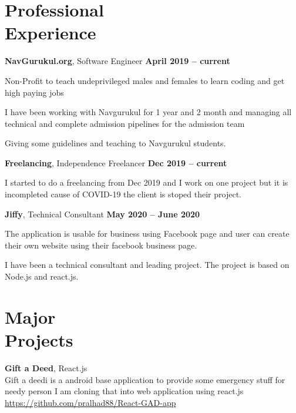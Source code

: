 \documentclass[margin,line]{resume}
\begin{document}
\begin{resume}
    \section{\mysidestyle Professional\\Experience}
    \textbf{NavGurukul.org}, Software Engineer \hfill \textbf{April 2019 -- current}
    \begin{list2}
        \item Non-Profit to teach undeprivileged males and females to learn coding and get high paying jobs
        \item I have been working with Navgurukul for 1 year and 2 month and managing all technical and complete admission pipelines for the admission team
        \item Giving some guidelines and teaching to Navgurukul students.
    \end{list2}\vspace{-1.5mm}

    \textbf{Freelancing}, Independence Freelancer \hfill \textbf{Dec 2019 -- current}
    \begin{list2}
        \item I started to do a freelancing from Dec 2019 and I work on one project but it is incompleted cause of COVID-19 the client is stoped their project.
    \end{list2}\vspace{-1.5mm}

    \textbf{Jiffy}, Technical Consultant \hfill \textbf{May 2020 -- June 2020}
    \begin{list2}
        \item The application is usable for business using Facebook page and user can create their own website using their facebook business page.
        \item I have been a technical consultant and leading project. The project is based on Node.js and react.js.
    \end{list2}\vspace{-1.5mm}

    \section{\mysidestyle Major\\Projects}
    \textbf{Gift a Deed}, React.js
    \\ Gift a deedi is a android base application to provide some emergency stuff for needy person I am cloning that into web application using react.js \url{https://github.com/pralhad88/React-GAD-app}
    

\end{resume}
\end{document}
